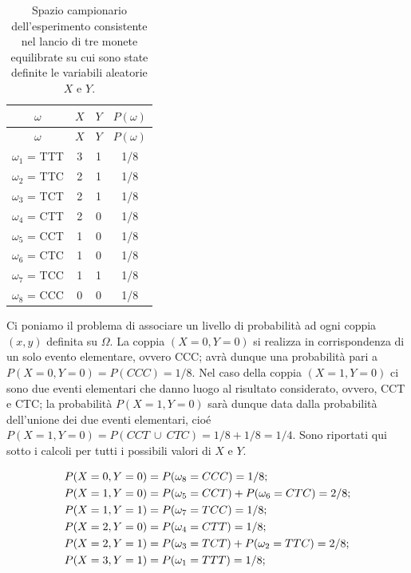 \documentclass[
  11pt,
]{krantz}
\theoremstyle{definition}
\theoremstyle{definition}
\theoremstyle{definition}
\theoremstyle{definition}
\theoremstyle{remark}
\begin{document}
\begin{longtable}[]{@{}cccc@{}}
\caption{\label{tab:tre-monete-distr-cong-1} Spazio campionario dell'esperimento consistente nel lancio di tre monete equilibrate su cui sono state definite le variabili aleatorie \(X\) e \(Y\).}\tabularnewline
\toprule
\(\omega\) & \(X\) & \(Y\) & \(P(\omega)\) \\
\midrule
\endfirsthead
\toprule
\(\omega\) & \(X\) & \(Y\) & \(P(\omega)\) \\
\midrule
\endhead
\(\omega_1\) = TTT & 3 & 1 & 1/8 \\
\(\omega_2\) = TTC & 2 & 1 & 1/8 \\
\(\omega_3\) = TCT & 2 & 1 & 1/8 \\
\(\omega_4\) = CTT & 2 & 0 & 1/8 \\
\(\omega_5\) = CCT & 1 & 0 & 1/8 \\
\(\omega_6\) = CTC & 1 & 0 & 1/8 \\
\(\omega_7\) = TCC & 1 & 1 & 1/8 \\
\(\omega_8\) = CCC & 0 & 0 & 1/8 \\
\bottomrule
\end{longtable}

Ci poniamo il problema di associare un livello di probabilità ad ogni coppia \((x, y)\) definita su \(\Omega\). La coppia \((X = 0, Y = 0)\) si realizza in corrispondenza di un solo evento elementare, ovvero CCC; avrà dunque una probabilità pari a \(P(X=0, Y=0) = P(CCC) = 1/8\). Nel caso della coppia \((X = 1, Y = 0)\) ci sono due eventi elementari che danno luogo al risultato considerato, ovvero, CCT e CTC; la probabilità \(P(X=1, Y=0)\) sarà dunque data dalla probabilità dell'unione dei due eventi elementari, cioé \(P(X=1, Y=0) = P(CCT \:\cup\: CTC) = 1/8 + 1/8 = 1/4\). Sono riportati qui sotto i calcoli per tutti i possibili valori di \(X\) e \(Y\).

\begin{align}
P(X = 0, Y = 0) &= P(\omega_8 = CCC) = 1/8; \notag\\
P(X = 1, Y = 0) &= P(\omega_5 = CCT) + P(\omega_6 = CTC) = 2/8; \notag\\
P(X = 1, Y = 1) &= P(\omega_7 = TCC) = 1/8; \notag\\
P(X = 2, Y = 0) &= P(\omega_4 = CTT) = 1/8; \notag\\
P(X = 2, Y = 1) &= P(\omega_3 = TCT) + P(\omega_2 = TTC) = 2/8; \notag\\
P(X = 3, Y = 1) &= P(\omega_1 = TTT) = 1/8; \notag
\end{align}
\end{document}
